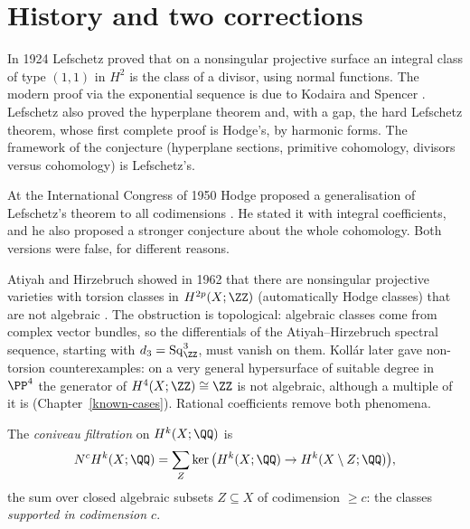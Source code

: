 \section{History and two corrections}\label{hodge-conjecture:section-history}

\begin{remark}[Lefschetz]\label{hodge-conjecture:remark-lefschetz}
In 1924 Lefschetz proved that on a nonsingular projective surface an integral class of type $(1,1)$ in $H^2$ is the class of a divisor, using normal functions. The modern proof via the
exponential sequence is due to Kodaira and Spencer \cite{kodaira-spencer-1953}. Lefschetz also proved the hyperplane theorem and, with a gap, the hard Lefschetz theorem, whose first complete
proof is Hodge's, by harmonic forms. The framework of the conjecture (hyperplane sections, primitive cohomology, divisors versus cohomology) is Lefschetz's.
\end{remark}

\begin{remark}[Hodge]\label{hodge-conjecture:remark-hodge-1950}
At the International Congress of 1950 Hodge proposed a generalisation of Lefschetz's theorem to all codimensions \cite{hodge-1950}. He stated it with integral coefficients, and he also
proposed a stronger conjecture about the whole cohomology. Both versions were false, for different reasons.
\end{remark}

\begin{remark}\label{hodge-conjecture:remark-integral}
Atiyah and Hirzebruch showed in 1962 that there are nonsingular projective varieties with torsion classes in $H^{2p}(X; \ZZ)$ (automatically Hodge classes) that are not algebraic
\cite{atiyah-hirzebruch-1962}. The obstruction is topological: algebraic classes come from complex vector bundles, so the differentials of the Atiyah--Hirzebruch spectral sequence, starting
with $d_3 = \mathrm{Sq}^3_\ZZ$, must vanish on them. Koll\'ar later gave non-torsion counterexamples: on a very general hypersurface of suitable degree in $\PP^4$ the generator of
$H^4(X; \ZZ) \cong \ZZ$ is not algebraic, although a multiple of it is (Chapter~\ref{known-cases}). Rational coefficients remove both phenomena.
\end{remark}

\begin{definition}\label{hodge-conjecture:definition-coniveau}
The \emph{coniveau filtration} on $H^k(X; \QQ)$ is
\[
N^cH^k(X; \QQ) = \sum_Z\ker\big(H^k(X; \QQ) \to H^k(X \setminus Z; \QQ)\big),
\]
the sum over closed algebraic subsets $Z \subseteq X$ of codimension $\geq c$: the classes \emph{supported in codimension $c$}.
\end{definition}

